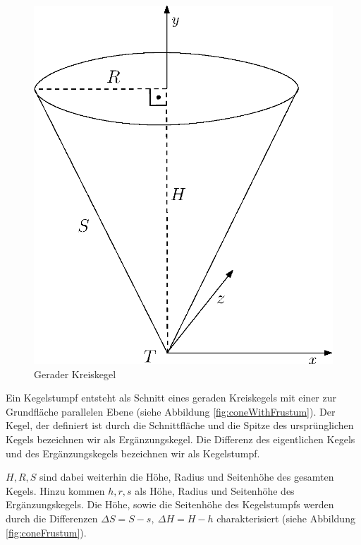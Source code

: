 \begin{figure}[!htb]
	\centering
	\includegraphics[scale=.5]{images/fullCone.eps}
	\caption{Gerader Kreiskegel}
	\label{fig:cone}
\end{figure}




\begin{definition}
	Ein Kegelstumpf entsteht als Schnitt eines geraden Kreiskegels mit einer zur Grundfläche parallelen Ebene (siehe Abbildung \ref{fig:coneWithFrustum}). Der Kegel, der definiert ist durch die Schnittfläche und die Spitze des ursprünglichen Kegels bezeichnen wir als Ergänzungskegel. Die Differenz des eigentlichen Kegels und des Ergänzungskegels bezeichnen wir als Kegelstumpf. 
	
	\noindent $H, R, S$ sind dabei weiterhin die Höhe, Radius und Seitenhöhe des gesamten Kegels. Hinzu kommen $h,r,s$ als Höhe, Radius und Seitenhöhe des Ergänzungskegels. Die Höhe, sowie die Seitenhöhe des Kegelstumpfs werden durch die Differenzen $\Delta S = S - s,~ \Delta H = H-h$ charakterisiert (siehe Abbildung \ref{fig:coneFrustum}).
\end{definition}

